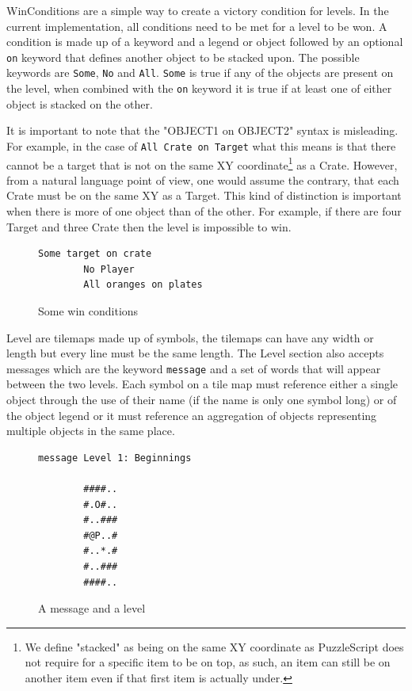 WinConditions are a simple way to create a victory condition for levels. In the current implementation, all conditions need to be met for a level to be won. A condition is made up of a keyword and a legend or object followed by an optional \texttt{on} keyword that defines another object to be stacked upon. The possible keywords are \texttt{Some}, \texttt{No} and \texttt{All}. \texttt{Some} is true if any of the objects are present on the level, when combined with the \texttt{on} keyword it is true if at least one of either object is stacked on the other.

It is important to note that the "OBJECT1 on OBJECT2" syntax is misleading. For example, in the case of \texttt{All Crate on Target} what this means is that there cannot be a target that is not on the same XY coordinate\footnote{We define "stacked" as being on the same XY coordinate as PuzzleScript does not require for a specific item to be on top, as such, an item can still be on another item even if that first item is actually under.} as a Crate. However, from a natural language point of view, one would assume the contrary, that each Crate must be on the same XY as a Target. This kind of distinction is important when there is more of one object than of the other. For example, if there are four Target and three Crate then the level is impossible to win.

\begin{figure}
    \centering
    \begin{lstlisting}[language=PuzzleScript]
        Some target on crate
        No Player
        All oranges on plates
    \end{lstlisting}
    \caption{Some win conditions}
    \label{fig:conditions_code_old}
\end{figure}

Level are tilemaps made up of symbols, the tilemaps can have any width or length but every line must be the same length. The Level section also accepts messages which are the keyword \texttt{message} and a set of words that will appear between the two levels. Each symbol on a tile map must reference either a single object through the use of their name (if the name is only one symbol long) or of the object legend or it must reference an aggregation of objects representing multiple objects in the same place.

\begin{figure}
    \centering
    \begin{lstlisting}[language=PuzzleScript]
        message Level 1: Beginnings
    
        ####..
        #.O#..
        #..###
        #@P..#
        #..*.#
        #..###
        ####..
    \end{lstlisting}
    \caption{A message and a level}
    \label{fig:level_code_old}
\end{figure}

